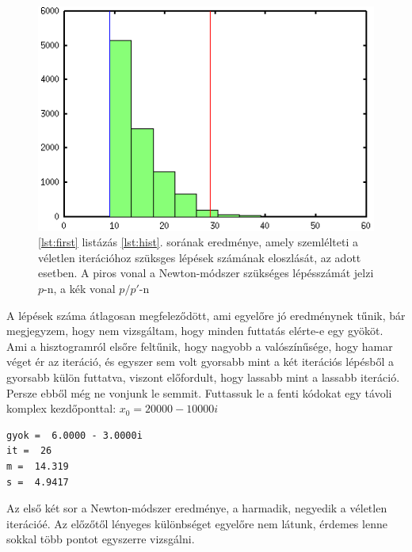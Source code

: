 \documentclass[a4paper,12pt]{report}
\begin{document}
				\begin{figure}[ht]
					\centering
					\includegraphics[scale=0.65]{hist.png}
					\caption{\ref{lst:first} listázás \ref{lst:hist}. sorának eredménye, amely szemlélteti a véletlen iterációhoz szüksges lépések számának eloszlását, az adott esetben. A piros vonal a Newton-módszer szükséges lépésszámát jelzi $p$-n, a kék vonal $p/p'$-n}\label{k11}
				\end{figure}
				
A lépések száma átlagosan megfeleződött, ami egyelőre jó eredménynek tűnik, bár megjegyzem, hogy nem vizsgáltam, hogy minden futtatás elérte-e egy gyököt. Ami a hisztogramról elsőre feltűnik, hogy nagyobb a valószínűsége, hogy hamar véget ér az iteráció, és egyszer sem volt gyorsabb mint a két iterációs lépésből a gyorsabb külön futtatva, viszont előfordult, hogy lassabb mint a lassabb iteráció. Persze ebből még ne vonjunk le semmit. Futtassuk le a fenti kódokat egy távoli komplex kezdőponttal: $x_0=20000-10000i$
				\begin{lstlisting}[caption=Eredmény]
gyok =  6.0000 - 3.0000i
it =  26
m =  14.319
s =  4.9417
				\end{lstlisting}
				Az első két sor a Newton-módszer eredménye, a harmadik, negyedik a véletlen iterációé. Az előzőtől lényeges különbséget egyelőre nem látunk, érdemes lenne sokkal több pontot egyszerre vizsgálni. 
\end{document}
